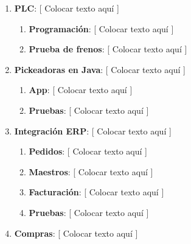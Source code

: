 \documentclass{article}
\begin{document}
\begin{enumerate}
			\begin{enumerate}[label*=\arabic*.]

				\item \textbf{PLC}: [ Colocar texto aquí ]

					\begin{enumerate}[label*=\arabic*.]
						\itemsep=3pt \topsep=0pt \partopsep=0pt \parskip=0pt \parsep=0pt

						\item \textbf{Programación}: [ Colocar texto aquí ]

						\item \textbf{Prueba de frenos}: [ Colocar texto aquí ]

					\end{enumerate}

				\item \textbf{Pickeadoras en Java}: [ Colocar texto aquí ]

					\begin{enumerate}[label*=\arabic*.]
						\itemsep=3pt \topsep=0pt \partopsep=0pt \parskip=0pt \parsep=0pt

						\item \textbf{App}: [ Colocar texto aquí ]

						\item \textbf{Pruebas}: [ Colocar texto aquí ]

					\end{enumerate}

				\item \textbf{Integración ERP}: [ Colocar texto aquí ]

					\begin{enumerate}[label*=\arabic*.]
						\itemsep=3pt \topsep=0pt \partopsep=0pt \parskip=0pt \parsep=0pt

						\item \textbf{Pedidos}: [ Colocar texto aquí ]

						\item \textbf{Maestros}: [ Colocar texto aquí ]

						\item \textbf{Facturación}: [ Colocar texto aquí ]

						\item \textbf{Pruebas}: [ Colocar texto aquí ]

					\end{enumerate}
			
				\item \textbf{Compras}: [ Colocar texto aquí ]


\end{enumerate}
\end{enumerate}
\end{document}
